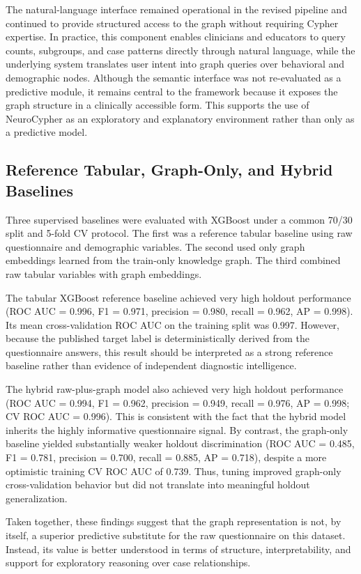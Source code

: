 The natural-language interface remained operational in the revised pipeline and continued to provide structured access to the graph without requiring Cypher expertise. In practice, this component enables clinicians and educators to query counts, subgroups, and case patterns directly through natural language, while the underlying system translates user intent into graph queries over behavioral and demographic nodes. Although the semantic interface was not re-evaluated as a predictive module, it remains central to the framework because it exposes the graph structure in a clinically accessible form. This supports the use of NeuroCypher as an exploratory and explanatory environment rather than only as a predictive model.

\subsection{Reference Tabular, Graph-Only, and Hybrid Baselines}

Three supervised baselines were evaluated with XGBoost under a common 70/30 split and 5-fold CV protocol. The first was a reference tabular baseline using raw questionnaire and demographic variables. The second used only graph embeddings learned from the train-only knowledge graph. The third combined raw tabular variables with graph embeddings.

The tabular XGBoost reference baseline achieved very high holdout performance (ROC AUC = 0.996, F1 = 0.971, precision = 0.980, recall = 0.962, AP = 0.998). Its mean cross-validation ROC AUC on the training split was 0.997. However, because the published target label is deterministically derived from the questionnaire answers, this result should be interpreted as a strong reference baseline rather than evidence of independent diagnostic intelligence.

The hybrid raw-plus-graph model also achieved very high holdout performance (ROC AUC = 0.994, F1 = 0.962, precision = 0.949, recall = 0.976, AP = 0.998; CV ROC AUC = 0.996). This is consistent with the fact that the hybrid model inherits the highly informative questionnaire signal. By contrast, the graph-only baseline yielded substantially weaker holdout discrimination (ROC AUC = 0.485, F1 = 0.781, precision = 0.700, recall = 0.885, AP = 0.718), despite a more optimistic training CV ROC AUC of 0.739. Thus, tuning improved graph-only cross-validation behavior but did not translate into meaningful holdout generalization.

Taken together, these findings suggest that the graph representation is not, by itself, a superior predictive substitute for the raw questionnaire on this dataset. Instead, its value is better understood in terms of structure, interpretability, and support for exploratory reasoning over case relationships.

